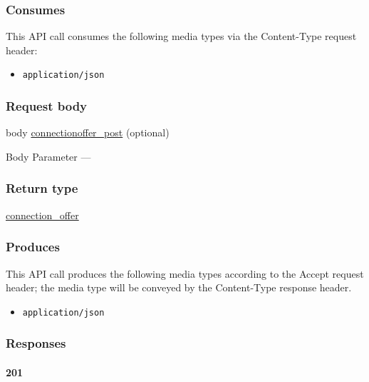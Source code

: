 \hypertarget{consumes-6}{%
\subsubsection{Consumes}\label{consumes-6}}

This API call consumes the following media types via the {Content-Type}
request header:

\begin{itemize}
\tightlist
\item
  \texttt{application/json}
\end{itemize}

\hypertarget{request-body-6}{%
\subsubsection{Request body}\label{request-body-6}}

body \protect\hyperlink{connectionoffer_post}{connectionoffer\_post}
(optional)

{Body Parameter} ---

\hypertarget{return-type-17}{%
\subsubsection{Return type}\label{return-type-17}}

\protect\hyperlink{connection_offer}{connection\_offer}

\hypertarget{produces-22}{%
\subsubsection{Produces}\label{produces-22}}

This API call produces the following media types according to the
{Accept} request header; the media type will be conveyed by the
{Content-Type} response header.

\begin{itemize}
\tightlist
\item
  \texttt{application/json}
\end{itemize}

\hypertarget{responses-22}{%
\subsubsection{Responses}\label{responses-22}}

\hypertarget{section-72}{%
\paragraph{201}\label{section-72}}

